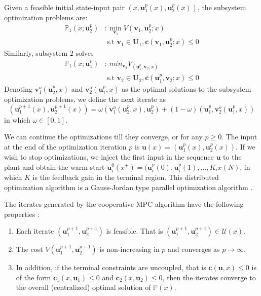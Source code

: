 \documentclass[10pt, twocolumn]{article}
\newcommand{\bu}{\mathbf{u}}
\theoremstyle{definition}
\begin{document}
Given a feasible initial state-input pair $(x,\bu_1^p(x),\bu_2^p(x))$, the subsystem optimization problems are:
\begin{align*} \mathbb{P}_1(x;\bu_2^p)&: \min_{\mathbf{v}_1}{V(\mathbf{v}_1,\bu_2^p;x)} \\&\text{~s.t~}  \mathbf{v}_1 \in \mathbf{U}_1, \mathbf{c}(\mathbf{v}_1,\bu_2^p;x) \leq 0 \end{align*}
Similarly, subsystem-$2$ solves
\begin{align*} \mathbb{P}_1(x;\bu_1^p)&:\ min_{\mathbf{v}_2}{V_(\bu_1^p,\mathbf{v}_2;x)}\\& \text{~s.t~}  \mathbf{v}_2 \in \mathbf{U}_2, \mathbf{c}(\bu_1^p,\mathbf{v}_2;x) \leq 0\end{align*}
Denoting $\mathbf{v}_1^o(\bu_2^p,x)$ and $\mathbf{v}_2^o(\bu_1^p,x)$ as the optimal solutions to the subsystem optimization problems, we define the next iterate as
\[ (\bu_1^{p+1}(x),\bu_2^{p+1}(x)) = \omega(\mathbf{v}_1^o(\bu_2^p,x),\bu_2^p)+(1-\omega)(\bu_1^{p},\mathbf{v}_2^o(\bu_1^p,x))\]
in which $\omega \in [0,1]$.

We can continue the optimizations till they converge, or for any $p\geq 0$. The input at the end of the optimization iteration $p$ is $\bu(x) = (\bu_1^{p}(x),\bu_2^{p}(x))$. If we wish to stop optimizations, we inject the first input in the sequence $\bu$ to the plant and obtain the warm start $\bu_i^0(x^+) = (\bu_i^{p}(0),\bu_i^{p}(1),\ldots,K_ix(N)$, in which $K$ is the feedback gain in the terminal region. This distributed optimization algorithm is a Gauss-Jordan type parallel optimization algorithm \citet[Chapter 3]{bertsekas:tsitsiklis:1989}.

The iterates generated by the cooperative MPC algorithm have the following properties \citep{stewart:venkat:rawlings:wright:pannocchia:2010} :
\begin{enumerate}
\item Each iterate $(\bu_1^{p+1},\bu_2^{p+1})$ is feasible. That is $(\bu_1^{p+1},\bu_2^{p+1}) \in \mathcal{U}(x)$.
\item The cost $V(\bu_1^{p+1},\bu_2^{p+1})$ is non-increasing in $p$ and converges as $p \rightarrow \infty$.
\item In addition, if the terminal constraints are uncoupled, that is $\mathbf{c}(\bu,x) \leq 0$ is of the form $\mathbf{c}_1(x,\bu_1) \leq 0$ and $\mathbf{c}_2(x,\bu_2) \leq 0$, then the iterates converge to the overall (centralized) optimal solution of $\mathbb{P}(x)$.
\end{enumerate}
\end{document}
